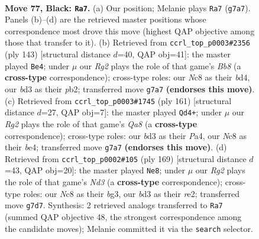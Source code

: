 \documentclass[11pt]{article}
\begin{document}
\clearpage

\begin{figure}[p]\centering
\begin{subfigure}{0.46\textwidth}\centering
\resizebox{\linewidth}{!}{%
\newchessgame
\chessboard[
  setfen={1Rnk4/6r1/P1P5/7p/8/2pB1KPP/2P5/8 b - - 0 77},
  showmover=false,
  pgfstyle=straightmove, color=movearrow, markmove={g7-a7}
]}
\caption{}
\end{subfigure}\hfill
\begin{subfigure}{0.46\textwidth}\centering
\resizebox{\linewidth}{!}{%
\newchessgame
\chessboard[
  setfen={8/5k2/7p/3r3P/p2B1PK1/P7/1P1R4/1b6 b - - 2 72},
  showmover=false,
  pgfstyle=straightmove, color=movearrow, markmove={b1-e4}
]}
\caption{}
\end{subfigure}
\\[4pt]
\begin{subfigure}{0.46\textwidth}\centering
\resizebox{\linewidth}{!}{%
\newchessgame
\chessboard[
  setfen={2Q5/4r3/1P1p3k/3P3P/p3Bp2/P4P2/3K4/q7 b - - 12 81},
  showmover=false,
  pgfstyle=straightmove, color=movearrow, markmove={a1-d4}
]}
\caption{}
\end{subfigure}\hfill
\begin{subfigure}{0.46\textwidth}\centering
\resizebox{\linewidth}{!}{%
\newchessgame
\chessboard[
  setfen={8/3k4/3n2P1/3p4/p2P2K1/2P3B1/1P2R3/6r1 b - - 0 85},
  showmover=false,
  pgfstyle=straightmove, color=movearrow, markmove={d6-e8}
]}
\caption{}
\end{subfigure}
\caption{\textbf{Move 77, Black: \texttt{Ra7}.} (a) Our position; Melanie plays \texttt{Ra7} (\texttt{g7a7}). Panels (b)--(d) are the retrieved master positions whose correspondence most drove this move (highest QAP objective among those that transfer to it). (b) Retrieved from \texttt{ccrl\_top\_p0003\#2356} (ply 143) [structural distance $d$=40, QAP obj=41]: the master played \texttt{Be4}; under $\mu$ our \emph{Rg2} plays the role of that game's \emph{Bb8} (a \textbf{cross-type} correspondence); cross-type roles: our \emph{N}c8 as their \emph{b}d4, our \emph{b}d3 as their \emph{p}b2; transferred move \texttt{g7a7} \textbf{(endorses this move)}. (c) Retrieved from \texttt{ccrl\_top\_p0003\#1745} (ply 161) [structural distance $d$=27, QAP obj=7]: the master played \texttt{Qd4+}; under $\mu$ our \emph{Rg2} plays the role of that game's \emph{Qa8} (a \textbf{cross-type} correspondence); cross-type roles: our \emph{b}d3 as their \emph{P}a4, our \emph{N}c8 as their \emph{b}e4; transferred move \texttt{g7a7} \textbf{(endorses this move)}. (d) Retrieved from \texttt{ccrl\_top\_p0002\#105} (ply 169) [structural distance $d$=43, QAP obj=20]: the master played \texttt{Ne8}; under $\mu$ our \emph{Rg2} plays the role of that game's \emph{Nd3} (a \textbf{cross-type} correspondence); cross-type roles: our \emph{N}c8 as their \emph{b}g3, our \emph{b}d3 as their \emph{r}e2; transferred move \texttt{g7d7}. Synthesis: 2 retrieved analogs transferred to \texttt{Ra7} (summed QAP objective 48, the strongest correspondence among the candidate moves); Melanie committed it via the \texttt{search} selector.}
\label{fig:thought-m153}
\end{figure}
\end{document}
